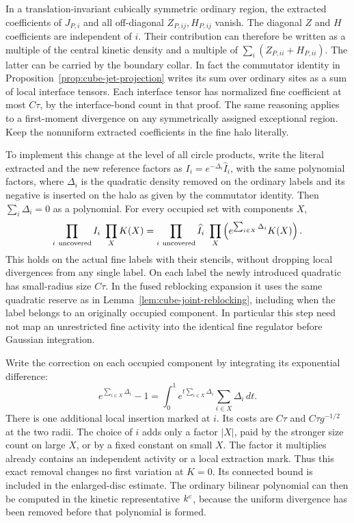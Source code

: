 \documentclass[11pt]{article}
\theoremstyle{definition}
\begin{document}
In a translation-invariant cubically symmetric ordinary region,
the extracted coefficients of \(J_{P,i}\) and all off-diagonal
\(Z_{P,ij},H_{P,ij}\) vanish. The diagonal \(Z\) and \(H\)
coefficients are independent of \(i\). Their contribution
can therefore be written as a multiple of the central kinetic
density and a multiple of \(\sum_i(Z_{P,ii}+H_{P,ii})\).
The latter can be carried by the boundary collar. In fact
the commutator identity in Proposition~\ref{prop:cube-jet-projection}
writes its sum over ordinary sites as a sum of local interface
tensors. Each interface tensor has normalized fine coefficient
at most \(C\tau\), by the interface-bond count in that proof.
The same reasoning applies to a first-moment divergence on
any symmetrically assigned exceptional region. Keep the
nonuniform extracted coefficients in the fine halo literally.

To implement this change at the level of all circle products,
write the literal extracted and the new reference factors
as \(I_i=e^{-\Delta_i}\widehat I_i\), with the same polynomial
factors, where \(\Delta_i\) is the quadratic density removed on
the ordinary labels and its negative is inserted on the halo
as given by the commutator identity. Then \(\sum_i\Delta_i=0\)
as a polynomial. For every occupied set with components \(X\),
\begin{equation}
 \prod_{i\ {\rm uncovered}} I_i\ \prod_X K(X)
 =
 \prod_{i\ {\rm uncovered}}\widehat I_i\
   \prod_X\left(e^{\sum_{i\in X}\Delta_i} K(X)\right).
\end{equation}
This holds on the actual fine labels with their stencils,
without dropping local divergences from any single label.
On each label the newly introduced quadratic has
small-radius size \(C\tau\). In the fused reblocking
expansion it uses the same quadratic reserve as in
Lemma~\ref{lem:cube-joint-reblocking}, including when the
label belongs to an originally occupied component.
In particular this step need not map an unrestricted
fine activity into the identical fine regulator before
Gaussian integration.

Write the correction on each occupied component by integrating
its exponential difference:
\begin{equation}
 e^{\sum_{i\in X}\Delta_i}-1
  =\int_0^1 e^{t\sum_{i\in X}\Delta_i}
            \sum_{i\in X}\Delta_i\,dt .
\end{equation}
There is one additional local insertion marked at \(i\).
Its costs are \(C\tau\) and \(C\tau g^{-1/2}\) at the two
radii. The choice of \(i\) adds only a factor \(|X|\),
paid by the stronger size count on large \(X\), or by a
fixed constant on small \(X\). The factor it multiplies
already contains an independent activity or a local
extraction mark. Thus this exact removal changes no
first variation at \(K=0\). Its connected bound is included
in the enlarged-disc estimate. The ordinary bilinear
polynomial can then be computed in the kinetic
representative \(k^{\rm c}\), because the uniform divergence
has been removed before that polynomial is formed.
\end{document}
